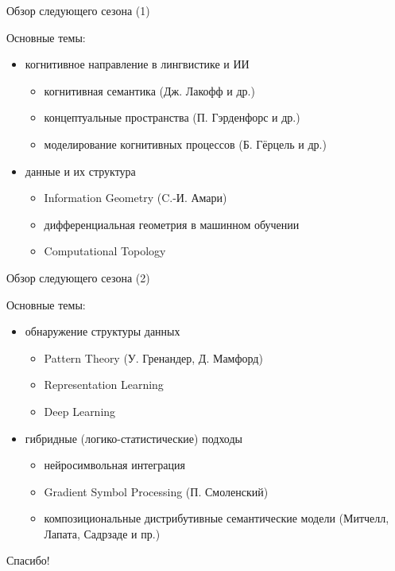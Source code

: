 \documentclass{beamer}
\begin{document}
\begin{frame}{Обзор следующего сезона (1)}
\begin{small}
Основные темы:\\
\medskip
\begin{itemize}
    \item когнитивное направление в лингвистике и ИИ
    \begin{itemize}
        \item когнитивная семантика (Дж. Лакофф и др.)
        \item концептуальные пространства (П. Гэрденфорс и др.)
        \item моделирование когнитивных процессов (Б. Гёрцель и др.)
    \end{itemize}
	\item данные и их структура
	\begin{itemize}
    	\item Information Geometry (C.-И. Амари)
    	\item дифференциальная геометрия в машинном обучении
    	\item Computational Topology
	\end{itemize}
\end{itemize}
\end{small}
\end{frame}

\begin{frame}{Обзор следующего сезона (2)}
\begin{small}
Основные темы:\\
\medskip
\begin{itemize}
	\item обнаружение структуры данных
	\begin{itemize}
    	\item Pattern Theory (У. Гренандер, Д. Мамфорд)
	    \item Representation Learning
	    \item Deep Learning
	\end{itemize}
	\item гибридные (логико-статистические) подходы
	\begin{itemize}
    	\item нейросимвольная интеграция
	    \item Gradient Symbol Processing (П. Смоленский)
	    \item композициональные дистрибутивные семантические модели (Митчелл, Лапата, Садрзаде и пр.)
	\end{itemize}
\end{itemize}
\end{small}
\end{frame}



\begin{frame}{}
    \thispagestyle{empty}
    \begin{center}
        {\large Спасибо!}
    \end{center}
\end{frame}


\end{document}
